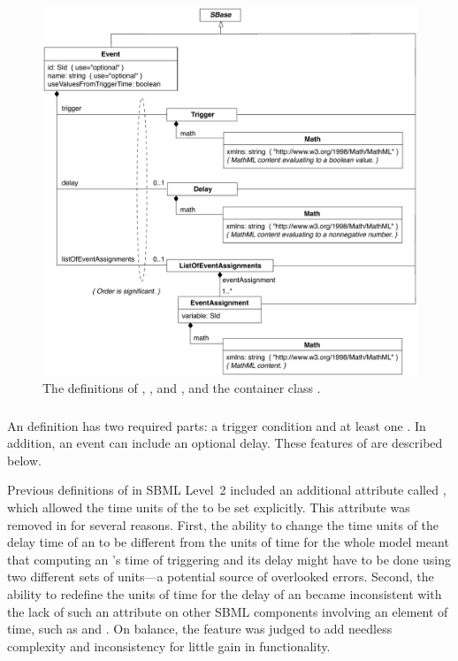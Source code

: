\begin{figure}[htb]
  \centering
  \small
  \includegraphics[scale=0.8]{figs/event-uml}
  \caption{The definitions of \Event, \Trigger, \Delay
      and \EventAssignment, and the container class
      \ListOfEventAssignments.}
  \label{fig:event}
\end{figure}


\subsubsection{}

An \Event definition has two required parts: a
trigger condition and at least one \EventAssignment.  In
  addition, an event can include an optional delay.  These features
  of \Event are described below.

Previous definitions of \Event in SBML Level~2 included an
additional attribute called , which allowed the
time units of the \Delay to be set explicitly.  This
attribute was removed in \sbmltwothree for several reasons.  First, the ability to
change the time units of the delay time of an \Event to be
different from the units of time for the whole model meant that
computing an \Event's time of triggering and its delay might have
to be done using two different sets of units---a potential source
of overlooked errors.  Second, the ability to redefine the units
of time for the delay of an \Event became inconsistent with the
lack of such an attribute on other SBML \thisLV components involving
an element of time, such as \RateRule and \KineticLaw.  On
balance, the  feature was judged to add needless
complexity and inconsistency for little gain in functionality.


